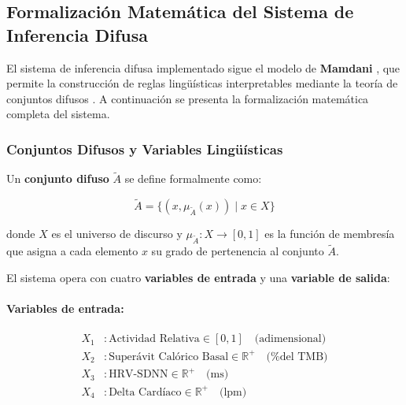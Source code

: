 
\subsection{Formalización Matemática del Sistema de Inferencia Difusa}
\label{subsec:formalizacion_sistema_difuso}

El sistema de inferencia difusa implementado sigue el modelo de \textbf{Mamdani} \citep{Mamdani1975}, que permite la construcción de reglas lingüísticas interpretables mediante la teoría de conjuntos difusos \citep{Zadeh1965}. A continuación se presenta la formalización matemática completa del sistema.

\subsubsection{Conjuntos Difusos y Variables Lingüísticas}
\label{subsubsec:conjuntos_difusos}

Un \textbf{conjunto difuso} \(\tilde{A}\) se define formalmente como:

\begin{equation}
\tilde{A} = \{(x, \mu_{\tilde{A}}(x)) \mid x \in X\}
\label{eq:conjunto_difuso}
\end{equation}

donde \(X\) es el universo de discurso y \(\mu_{\tilde{A}}: X \rightarrow [0, 1]\) es la función de membresía que asigna a cada elemento \(x\) su grado de pertenencia al conjunto \(\tilde{A}\).

El sistema opera con cuatro \textbf{variables de entrada} y una \textbf{variable de salida}:

\paragraph{Variables de entrada:}
\begin{align}
X_1 &: \text{Actividad Relativa} \in [0, 1] \quad \text{(adimensional)} \label{eq:var_actividad} \\
X_2 &: \text{Superávit Calórico Basal} \in \mathbb{R}^+ \quad \text{(\% del TMB)} \label{eq:var_superavit} \\
X_3 &: \text{HRV-SDNN} \in \mathbb{R}^+ \quad \text{(ms)} \label{eq:var_hrv} \\
X_4 &: \text{Delta Cardíaco} \in \mathbb{R}^+ \quad \text{(lpm)} \label{eq:var_delta}
\end{align}

